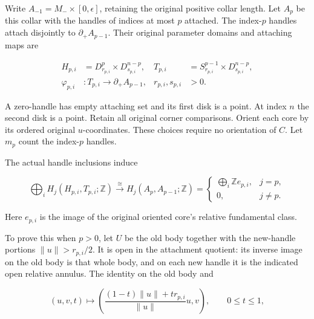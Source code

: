 Write \(A_{-1}=M_-\times[0,\epsilon]\), retaining the original positive collar length. Let \(A_p\) be this collar with the handles of indices at most \(p\) attached. The index-\(p\) handles attach disjointly to \(\partial_+A_{p-1}\). Their original parameter domains and attaching maps are

\begin{equation}
\begin{aligned}
 H_{p,i}&=D^p_{r_{p,i}}\times D^{n-p}_{s_{p,i}},&
 T_{p,i}&=S^{p-1}_{r_{p,i}}\times D^{n-p}_{s_{p,i}},\\
 \varphi_{p,i}&:T_{p,i}\longrightarrow\partial_+A_{p-1},&
 r_{p,i},s_{p,i}&>0.
 \end{aligned}
 \label{courseIII:integral-handle-chains-and-signed-incidences:eq:1.1}
\end{equation}

A zero-handle has empty attaching set and its first disk is a point. At index \(n\) the second disk is a point. Retain all original corner comparisons. Orient each core by its ordered original \(u\)-coordinates. These choices require no orientation of \(C\). Let \(m_p\) count the index-\(p\) handles.

The actual handle inclusions induce

\begin{equation}
\bigoplus_i H_j(H_{p,i},T_{p,i};\mathbb Z)
 \xrightarrow{\ \cong\ }H_j(A_p,A_{p-1};\mathbb Z)
 =
 \begin{cases}
 \displaystyle\bigoplus_i\mathbb Z e_{p,i},&j=p,\\
 0,&j\ne p.
 \end{cases}
 \label{courseIII:integral-handle-chains-and-signed-incidences:eq:1.2}
\end{equation}

Here \(e_{p,i}\) is the image of the original oriented core's relative fundamental class.

To prove this when \(p>0\), let \(U\) be the old body together with the new-handle portions \(\|u\|>r_{p,i}/2\). It is open in the attachment quotient: its inverse image on the old body is that whole body, and on each new handle it is the indicated open relative annulus. The identity on the old body and

\begin{equation}
(u,v,t)\longmapsto
 \left(\frac{(1-t)\|u\|+tr_{p,i}}{\|u\|}u,v\right),
 \qquad 0\leq t\leq1,
 \label{courseIII:integral-handle-chains-and-signed-incidences:eq:1.3}
\end{equation}

